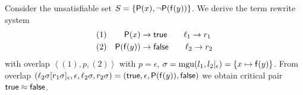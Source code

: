 \begin{example}
	Consider the unsatisfiable set $S = \{ {\mathsf P}(x), \lnot {\mathsf P}({\mathsf f}(y)) \}$. 
	We derive the term rewrite system 
	\begin{align*}
	(1)&&
		\mP(x) &\rwEQ \mathsf{true}
		\tag*{$\ell_1 \rwEQ r_1$}
		\\
	(2)&&
		\mP(\mf(y)) &\rwEQ \mathsf{false}
		\tag*{$\ell_2 \rwEQ r_2$}
	\end{align*}
	with overlap $\left<(1),p,(2)\right>$ with $p=\epsilon$, 
	$\sigma = \operatorname{mgu}(l_1, l_2|_\epsilon) = \{ x\mapsto {\mathsf f}(y)\}$.
	From overlap $\left(\ell_2\sigma[r_1\sigma]_\epsilon, \epsilon, \ell_2\sigma, r_2\sigma\right)
	= (\mathsf{true}, \epsilon, {\mathsf P}({\mathsf f}(y)), \mathsf{false})$
	we obtain critical pair $\mathsf{true} \approx \mathsf{false}$.
	
\end{example}




